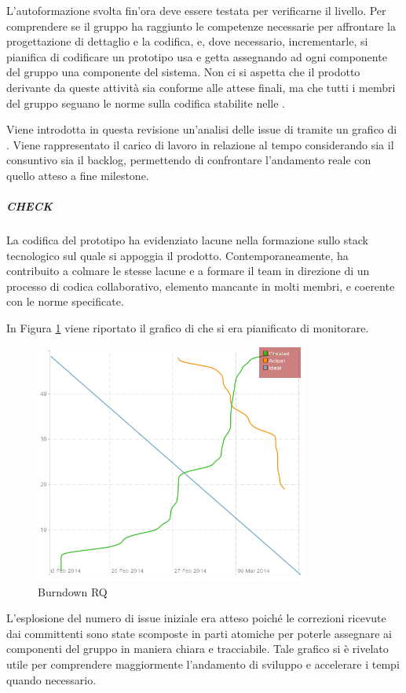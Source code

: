 	L'autoformazione svolta fin'ora deve essere testata per verificarne il livello. Per comprendere se il gruppo ha raggiunto le competenze necessarie per affrontare la progettazione di dettaglio e la codifica, e, dove necessario, incrementarle, si pianifica di codificare un prototipo usa e getta assegnando ad ogni componente del gruppo una componente del sistema. Non ci si aspetta che il prodotto derivante da queste attività sia conforme alle attese finali, ma che tutti i membri del gruppo seguano le norme sulla codifica stabilite nelle \NormeDiProgetto{}.
	
	Viene introdotta in questa revisione un'analisi delle issue di  tramite un grafico di . Viene rappresentato il carico di lavoro in relazione al tempo considerando sia il consuntivo sia il backlog, permettendo di confrontare l'andamento reale con quello atteso a fine milestone.
	
	\subparagraph{CHECK}
	La codifica del prototipo ha evidenziato lacune nella formazione sullo stack tecnologico sul quale si appoggia il prodotto. Contemporaneamente, ha contribuito a colmare le stesse lacune e a formare il team in direzione di un processo di codica collaborativo, elemento mancante in molti membri, e coerente con le norme specificate.

	In Figura \ref{fig:burndownRQ} viene riportato il grafico di  che si era pianificato di monitorare.
	
	\begin{figure}[H]
		\centering \includegraphics[width=0.8\textwidth]{burndownRQ.png}
		\caption{Burndown RQ}
		\label{fig:burndownRQ}
	\end{figure}
	
	L'esplosione del numero di issue iniziale era atteso poiché le correzioni ricevute dai committenti sono state scomposte in parti atomiche per poterle assegnare ai componenti del gruppo in maniera chiara e tracciabile. Tale grafico si è rivelato utile per comprendere maggiormente l'andamento di sviluppo e accelerare i tempi quando necessario.